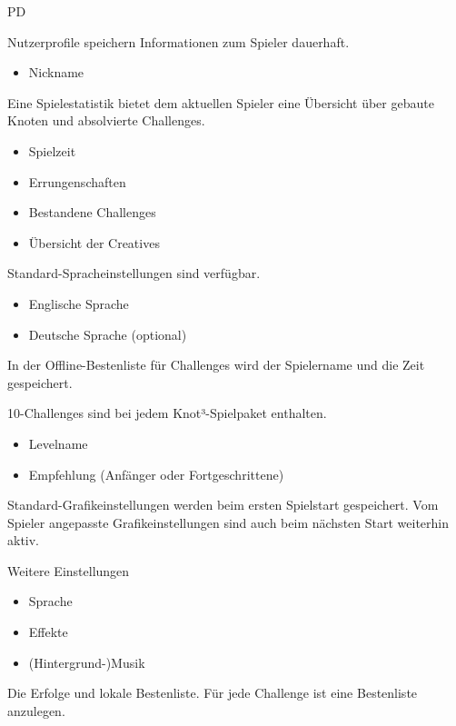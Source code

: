 \begin{ids}{\gls{PD}}

	\id[10] Nutzerprofile speichern Informationen zum Spieler dauerhaft. 
	  \begin{itemize}
         \item Nickname
      \end{itemize}
      
     \id[20] Eine Spielestatistik bietet dem aktuellen Spieler eine Übersicht über gebaute Knoten und absolvierte Challenges.
     \begin{itemize}
       \item Spielzeit
       \item Errungenschaften
       \item Bestandene Challenges
       \item Übersicht der Creatives
     \end{itemize}
     
     \id[30] Standard-Spracheinstellungen sind verfügbar.
     \begin{itemize}
       \item Englische Sprache
       \item Deutsche Sprache (optional)
     \end{itemize}
     
	 \id[40] In der Offline-Bestenliste für Challenges wird der Spielername und die Zeit gespeichert.
\item 10-Challenges sind bei jedem Knot³-Spielpaket enthalten.
      \begin{itemize}
      \item Levelname
      \item Empfehlung (Anfänger oder      Fortgeschrittene)
      \end{itemize}

	 \id[50] \item Standard-Grafikeinstellungen werden beim ersten Spielstart gespeichert. Vom Spieler angepasste Grafikeinstellungen sind auch beim nächsten Start weiterhin aktiv.
	 
	 \id[60] Weitere Einstellungen
	 \begin{itemize}
     \item Sprache
     \item Effekte
     \item (Hintergrund-)Musik
     \end{itemize}
     
	 \id[70] Die Erfolge und lokale Bestenliste. Für jede Challenge ist eine Bestenliste anzulegen.
	 

\end{ids}
